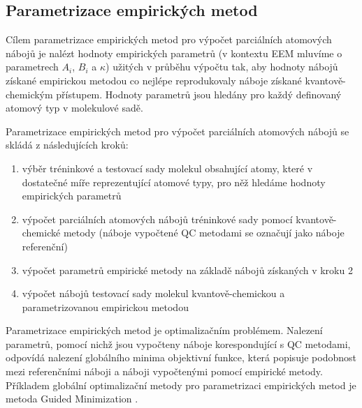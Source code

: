 \subsection{Parametrizace empirických metod}
\label{param}
Cílem parametrizace empirických metod pro výpočet parciálních atomových nábojů je nalézt hodnoty empirických parametrů (v kontextu EEM mluvíme o parametrech $A_i$, $B_i$ a $\kappa$) užitých v průběhu výpočtu tak, aby hodnoty nábojů získané empirickou metodou co nejlépe reprodukovaly náboje získané kvantově-chemickým přístupem. Hodnoty parametrů jsou hledány pro každý definovaný atomový typ v molekulové sadě.

Parametrizace empirických metod pro výpočet parciálních atomových nábojů se skládá z následujících kroků:

\begin{enumerate}
\itemsep0em
    \item výběr tréninkové a testovací sady molekul obsahující atomy, které v dostatečné míře reprezentující atomové typy, pro něž hledáme hodnoty empirických parametrů
    \item výpočet parciálních atomových nábojů tréninkové sady pomocí kvantově-chemi\-cké metody (náboje vypočtené QC metodami se označují jako náboje referenční)
    \item výpočet parametrů empirické metody na základě nábojů získaných v kroku 2
    \item výpočet nábojů testovací sady molekul kvantově-chemickou a parametrizovanou empirickou metodou
\end{enumerate}

Parametrizace empirických metod je optimalizačním problémem. Nalezení parametrů, pomocí nichž jsou vypočteny náboje korespondující s QC metodami, odpovídá nalezení globálního minima objektivní funkce, která popisuje podobnost mezi referenčními náboji a náboji vypočtenými pomocí empirické metody. Příkladem globální optimalizační metody pro parametrizaci empirických metod je metoda Guided Minimization \cite{guided_m}.

